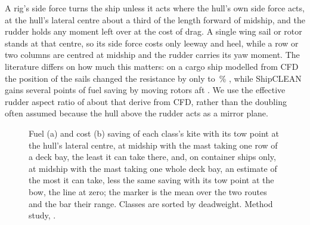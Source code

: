 A rig's side force turns the ship unless it acts where the hull's own side force acts, at the hull's lateral centre about a third of the length forward of midship, and the rudder holds any moment left over at the cost of drag. A single wing sail or rotor stands at that centre, so its side force costs only leeway and heel, while a row or two columns are centred at midship and the rudder carries its yaw moment. The literature differs on how much this matters: on a cargo ship modelled from CFD the position of the sails changed the resistance by only  to \,\% \citep{kramer2022}, while ShipCLEAN gains several points of fuel saving by moving rotors aft \citep{tillig2020}. We use the effective rudder aspect ratio of about  that \citet{kramer2022} derive from CFD, rather than the doubling often assumed because the hull above the rudder acts as a mirror plane.


\begin{figure}[tbp]
\centering
{}
\caption{ Fuel (a) and cost (b) saving of each class's kite with its tow point at the hull's lateral centre, at midship with the mast taking one row of a deck bay, the least it can take there, and, on container ships only, at midship with the mast taking one whole deck bay, an estimate of the most it can take, less the same saving with its tow point at the bow, the line at zero; the marker is the mean over the two routes and the bar their range. Classes are sorted by deadweight. Method study, .}
\label{fig:tow_point}
\end{figure}

